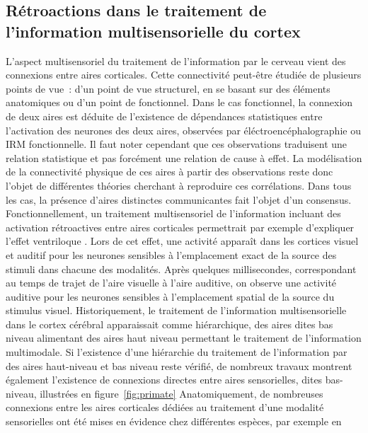 \documentclass[../main]{subfiles}
\begin{document}
\subsection{Rétroactions dans le traitement de l'information multisensorielle du cortex}
L'aspect multisensoriel du traitement de l'information par le cerveau vient des connexions entre aires corticales.
Cette connectivité peut-être étudiée de plusieurs points de vue~: d'un point de vue structurel, en se basant sur des éléments anatomiques ou d'un point de fonctionnel.
Dans le cas fonctionnel, la connexion de deux aires est déduite de l'existence de dépendances statistiques entre l'activation des neurones des deux aires, observées par éléctroencéphalographie ou IRM fonctionnelle. Il faut noter cependant que ces observations traduisent une relation statistique et pas forcément une relation de cause à effet. 
La modélisation de la connectivité physique de ces aires à partir des observations reste donc l'objet de différentes théories cherchant à reproduire ces corrélations. 
Dans tous les cas, la présence d'aires distinctes communicantes fait l'objet d'un consensus. 
Fonctionnellement, un traitement multisensoriel de l'information incluant des activation rétroactives entre aires corticales permettrait par exemple d'expliquer l'effet ventriloque \cite{Bonath2007NeuralBO}. Lors de cet effet, une activité apparaît dans les cortices visuel et auditif pour les neurones sensibles à l'emplacement exact de la source des stimuli dans chacune des modalités. Après quelques millisecondes, correspondant au temps de trajet de l'aire visuelle à l'aire auditive, on observe une activité auditive pour les neurones sensibles à l'emplacement spatial de la source du stimulus visuel.
Historiquement, le traitement de l'information multisensorielle dans le cortex cérébral apparaissait comme hiérarchique, des aires dites bas niveau alimentant des aires haut niveau permettant le traitement de l'information multimodale. 
Si l'existence d'une hiérarchie du traitement de l'information par des aires haut-niveau et bas niveau reste vérifié, de nombreux travaux montrent également l'existence de connexions directes entre aires sensorielles, dites bas-niveau, illustrées en figure~\ref{fig:primate}
Anatomiquement, de nombreuses connexions entre les aires corticales dédiées au traitement d'une modalité sensorielles ont été mises en évidence chez différentes espèces, par exemple en \cite{Calvert2004MultisensoryIM, Cappe2009MultisensoryAP,Foxe2005TheCF,Schroeder2005MultisensoryCT}
\end{document}
